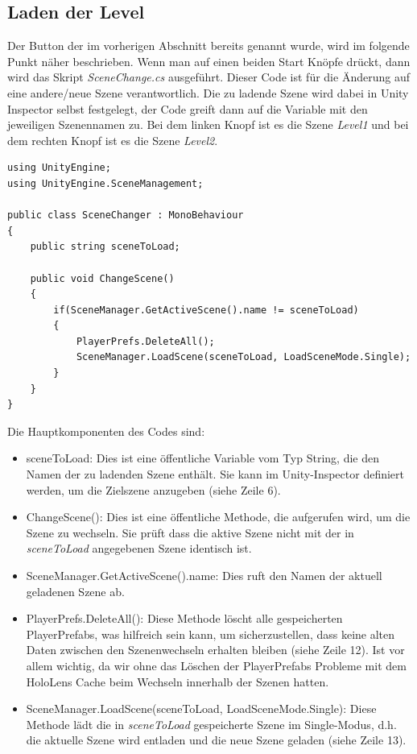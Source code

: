 \subsection{Laden der Level}
Der Button der im vorherigen Abschnitt bereits genannt wurde, wird im folgende Punkt näher beschrieben. Wenn man auf einen
beiden Start Knöpfe drückt, dann wird das Skript \textit{SceneChange.cs} ausgeführt. Dieser Code ist für die Änderung auf
eine andere/neue Szene verantwortlich. Die zu ladende Szene wird dabei in Unity Inspector selbst festgelegt, der Code greift
dann auf die Variable mit den jeweiligen Szenennamen zu. Bei dem linken Knopf ist es die Szene \textit{Level1} und bei dem
rechten Knopf ist es die Szene \textit{Level2}.

\begin{lstlisting}[style=csharp, caption=Auf Knopfdruck Szene wechseln. label=code:scenechange]
using UnityEngine;
using UnityEngine.SceneManagement;

public class SceneChanger : MonoBehaviour
{
    public string sceneToLoad;

    public void ChangeScene()
    {
        if(SceneManager.GetActiveScene().name != sceneToLoad)
        {
            PlayerPrefs.DeleteAll();
            SceneManager.LoadScene(sceneToLoad, LoadSceneMode.Single);
        }
    }
}
\end{lstlisting}

Die Hauptkomponenten des Codes sind:
\begin{itemize}
\item{sceneToLoad:} Dies ist eine öffentliche Variable vom Typ String, die den Namen der zu ladenden Szene enthält. Sie
kann im Unity-Inspector definiert werden, um die Zielszene anzugeben (siehe Zeile 6).
\item{ChangeScene():} Dies ist eine öffentliche Methode, die aufgerufen wird, um die Szene zu wechseln. Sie prüft dass
die aktive Szene nicht mit der in \textit{sceneToLoad} angegebenen Szene identisch ist.
\item{SceneManager.GetActiveScene().name:} Dies ruft den Namen der aktuell geladenen Szene ab.
\item{PlayerPrefs.DeleteAll():} Diese Methode löscht alle gespeicherten PlayerPrefabs, was hilfreich sein kann, um
sicherzustellen, dass keine alten Daten zwischen den Szenenwechseln erhalten bleiben (siehe Zeile 12). Ist vor allem wichtig,
da wir ohne das Löschen der PlayerPrefabs Probleme mit dem HoloLens Cache beim Wechseln innerhalb der Szenen hatten.
\item{SceneManager.LoadScene(sceneToLoad, LoadSceneMode.Single):} Diese Methode lädt die in \textit{sceneToLoad}
gespeicherte Szene im Single-Modus, d.h. die aktuelle Szene wird entladen und die neue Szene geladen (siehe Zeile 13).
\end{itemize}

